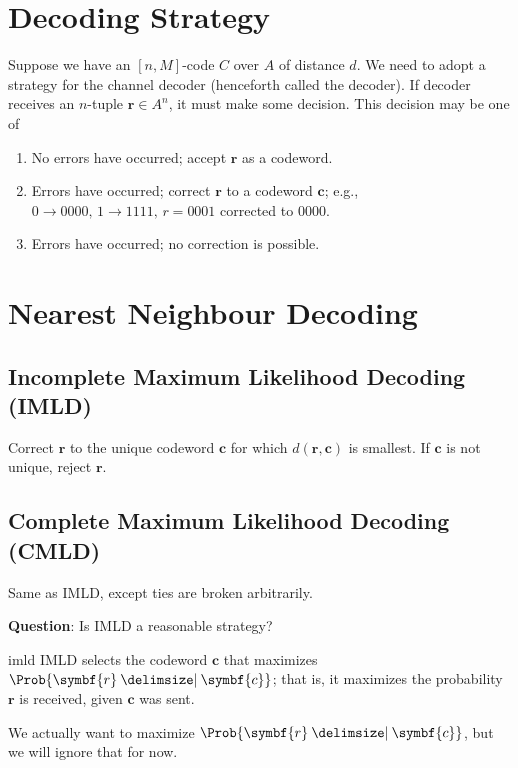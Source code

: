 
\section{Decoding Strategy}
Suppose we have an $ [n,M] $-code $ C $ over $ A $ of distance $ d $.
We need to adopt a strategy for the channel decoder (henceforth called the decoder).
If decoder receives an $ n $-tuple $ \symbf{r}\in A^n $, it must make some decision.
This decision may be one of
\begin{enumerate}[label=(\roman*)]
    \item No errors have occurred; accept $ \symbf{r} $ as a codeword.
    \item Errors have occurred; correct $ \symbf{r} $ to a codeword $ \symbf{c} $;
          e.g., $ 0 \rightarrow 0000,\,1 \rightarrow 1111,\,r=0001 $ corrected to
          $ 0000 $.
    \item Errors have occurred; no correction is possible.
\end{enumerate}

\section{Nearest Neighbour Decoding}
\subsection*{Incomplete Maximum Likelihood Decoding (IMLD)}
Correct $ \symbf{r} $ to the unique codeword $ \symbf{c} $ for which
$ d(\symbf{r},\symbf{c}) $ is smallest.
If $ \symbf{c} $ is not unique, reject $ \symbf{r} $.
\subsection*{Complete Maximum Likelihood Decoding (CMLD)}
Same as IMLD, except ties are broken arbitrarily.

\textbf{Question}: Is IMLD a reasonable strategy?

\begin{Theorem}{}{imld}
    IMLD selects the codeword $ \symbf{c} $ that maximizes $ \Prob{\symbf{r}\given \symbf{c}} $; that is,
    it maximizes the probability $ \symbf{r} $ is received, given $ \symbf{c} $ was sent.
\end{Theorem}

We actually want to maximize $ \Prob{\symbf{r}\given \symbf{c}} $, but we will ignore that for now.


